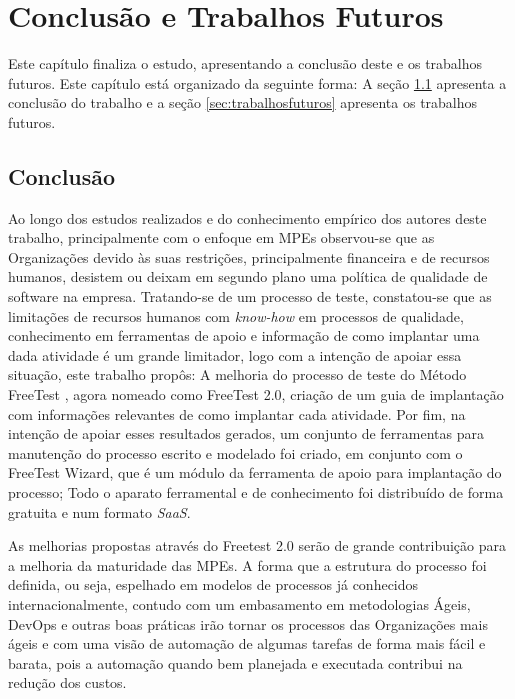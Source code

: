 \chapter{Conclusão e Trabalhos Futuros}
\label{sec:conclusaoetrabalhosfuturos}

Este capítulo finaliza o estudo, apresentando a conclusão deste e os trabalhos futuros. Este capítulo está organizado da seguinte forma: A seção \ref{sec:finalconclusao} apresenta a conclusão do trabalho e a seção \ref{sec:trabalhosfuturos} apresenta os trabalhos futuros. 

\section{Conclusão}
\label{sec:finalconclusao}

Ao longo dos estudos realizados e do conhecimento empírico dos autores deste trabalho, principalmente com o enfoque em MPEs observou-se que as Organizações devido às suas restrições, principalmente financeira e de recursos humanos, desistem ou deixam em segundo plano uma política de qualidade de software na empresa. Tratando-se de um processo de teste, constatou-se que as limitações de recursos humanos com \textit{know-how} em processos de qualidade, conhecimento em ferramentas de apoio e informação de como implantar uma dada atividade é um grande limitador, logo com a intenção de apoiar essa situação, este trabalho propôs: A melhoria do processo de teste do Método FreeTest \cite{Camilo-junior2012}, agora nomeado como FreeTest 2.0, criação de um guia de implantação com informações relevantes de como implantar cada atividade. Por fim, na intenção de apoiar esses resultados gerados, um conjunto de ferramentas para manutenção do processo escrito e modelado foi criado, em conjunto com o FreeTest Wizard, que é um módulo da ferramenta de apoio para implantação do processo; Todo o aparato ferramental e de conhecimento foi distribuído de forma gratuita e num formato \textit{SaaS}.

As melhorias propostas através do Freetest 2.0 serão de grande contribuição para a melhoria da maturidade das MPEs. A forma que a estrutura do processo foi definida, ou seja, espelhado em modelos de processos já conhecidos internacionalmente, contudo com um embasamento em metodologias Ágeis, DevOps e outras boas práticas irão tornar os processos das Organizações mais ágeis e com uma visão de automação de algumas tarefas de forma mais fácil e barata, pois a automação quando bem planejada e executada contribui na redução dos custos. 

